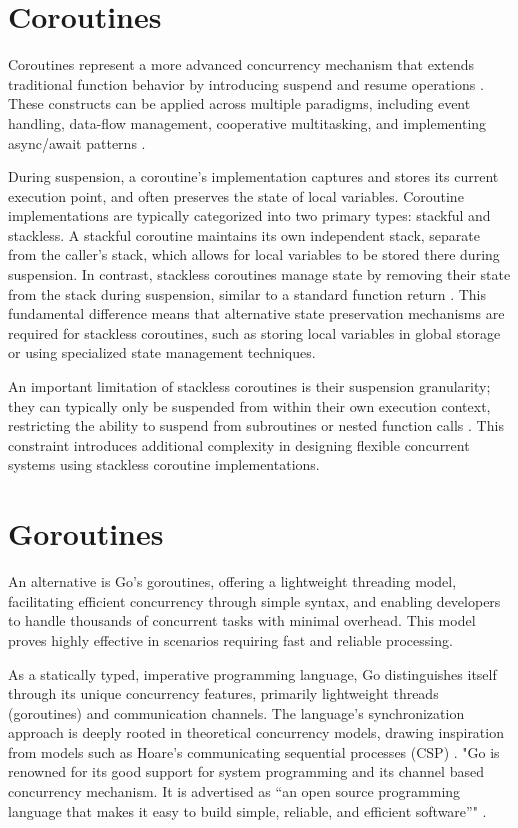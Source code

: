 \documentclass[]{final}
\begin{document}
\section{Coroutines}

Coroutines represent a more advanced concurrency mechanism that extends
traditional function behavior by introducing suspend and resume operations \cite{belson_survey_2019}.
These  constructs can be applied across multiple paradigms, including event
handling, data-flow management, cooperative multitasking, and
implementing async/await patterns \cite{belson_survey_2019}.

During suspension, a coroutine's implementation captures and stores
its current execution point, and often preserves the state of local variables.
Coroutine implementations are typically categorized into two primary types:
stackful and stackless. A stackful coroutine maintains its own independent
stack, separate from the caller's stack, which allows for local variables
to be stored there during suspension. In contrast, stackless coroutines
manage state by removing their state from the stack
during suspension, similar to a standard function return \cite{belson_survey_2019}.
This fundamental difference means that alternative state preservation
mechanisms are required for stackless coroutines, such as storing
local variables in global storage or using specialized state management techniques.

An important limitation of stackless coroutines is their suspension granularity;
they can typically only be suspended from within their own execution context,
restricting the ability to suspend from subroutines or nested function calls
\cite{belson_survey_2019}. This constraint introduces additional complexity
in designing flexible concurrent systems using stackless coroutine implementations.

\section{Goroutines}

An alternative is Go’s goroutines, offering a lightweight threading model,
facilitating efficient concurrency through
simple syntax, and enabling developers to handle thousands of concurrent tasks with
minimal overhead. This model proves highly effective in scenarios requiring fast
and reliable processing.

As a statically typed, imperative programming language, Go distinguishes
itself through its unique concurrency features, primarily lightweight threads
(goroutines) and communication channels.
The language's synchronization approach
is deeply rooted in theoretical concurrency models,
drawing inspiration from models such as Hoare's communicating sequential
processes (CSP) \cite{lange_empirical_2019}.
"Go is renowned for its good support for system programming
and its channel based concurrency mechanism. It is advertised
as “an open source programming
language that makes it easy to build simple, reliable, and
efficient software”" \cite{lange_empirical_2019}.
\end{document}
